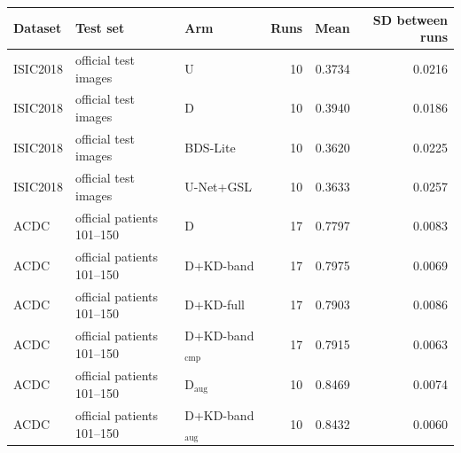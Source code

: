 \begin{tabular}{lllrrr}
\toprule
Dataset & Test set & Arm & Runs & Mean & SD between runs \\
\midrule
ISIC2018 & official test images & U & 10 & 0.3734 & 0.0216 \\
ISIC2018 & official test images & D & 10 & 0.3940 & 0.0186 \\
ISIC2018 & official test images & BDS-Lite & 10 & 0.3620 & 0.0225 \\
ISIC2018 & official test images & U-Net+GSL & 10 & 0.3633 & 0.0257 \\
ACDC & official patients 101--150 & D & 17 & 0.7797 & 0.0083 \\
ACDC & official patients 101--150 & D+KD-band & 17 & 0.7975 & 0.0069 \\
ACDC & official patients 101--150 & D+KD-full & 17 & 0.7903 & 0.0086 \\
ACDC & official patients 101--150 & D+KD-band$_{\mathrm{cmp}}$ & 17 & 0.7915 & 0.0063 \\
ACDC & official patients 101--150 & D$_{\mathrm{aug}}$ & 10 & 0.8469 & 0.0074 \\
ACDC & official patients 101--150 & D+KD-band$_{\mathrm{aug}}$ & 10 & 0.8432 & 0.0060 \\
\bottomrule
\end{tabular}
